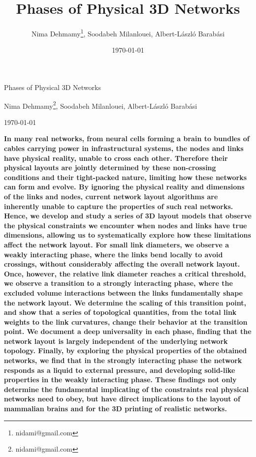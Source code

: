 \documentclass[nofootinbib,preprint,floatfix,titlepage,endfloats]{revtex4} %
\begin{document}
\title{Phases of Physical 3D Networks}
\author{Nima Dehmamy\thanks{nidami@gmail.com}, Soodabeh Milanlouei, Albert-L\'aszl\'o Barab\'asi}
\date{\today}
\centerline{\Huge Phases of Physical 3D Networks}
\medskip
\centerline{Nima Dehmamy\footnote{nidami@gmail.com}, Soodabeh Milanlouei, Albert-L\'aszl\'o Barab\'asi}
\centerline{\today}
\bigskip
{\bf 
In many real networks, from neural cells forming a brain to bundles of cables carrying power in infrastructural systems, the nodes and links have physical reality, unable to cross each other. Therefore their physical layouts are jointly determined by these non-crossing conditions and their tight-packed nature, limiting how these networks can form and evolve. By ignoring the physical reality and dimensions of the links and nodes, current network layout algorithms are inherently unable to capture the properties of such real networks. Hence, we develop and study a series of 3D layout models that observe the physical constraints we encounter when nodes and links have true dimensions, allowing us to systematically explore how these limitations affect the network layout. For small link diameters, we observe a weakly interacting phase, where the links bend locally to avoid crossings, without considerably affecting the overall network layout. Once, however, the relative link diameter reaches a critical threshold, we observe a transition to a strongly interacting phase, where the excluded volume interactions between the links fundamentally shape the network layout. We determine the scaling of this transition point, and show that a series of topological quantities, from the total link weights to the link curvatures, change their behavior at the transition point. We document a deep universality in each phase, finding that the network layout is largely independent of the underlying network topology. Finally, by exploring the physical properties of the obtained networks, we find that in the strongly interacting phase the network responds as a liquid to external pressure, and developing solid-like properties in the weakly interacting phase. These findings not only determine the fundamental implicating of the constraints real physical networks need to obey, but have direct implications to the layout of mammalian brains and for the 3D printing of realistic networks.
}
\end{document}
